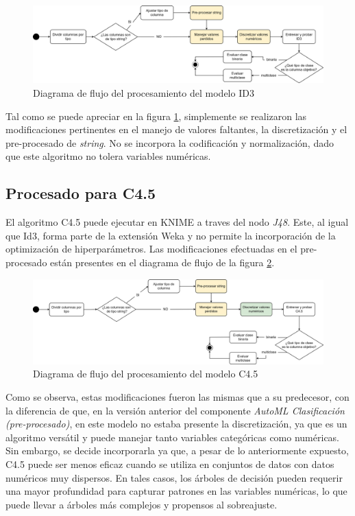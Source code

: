 \begin{figure}[H]
	\centering
	\includegraphics[width=1\linewidth]{"figuras/capi 2/modelos/procesado id3.drawio"}
	\caption{Diagrama de flujo del procesamiento del modelo ID3}
	\label{fig:procesado-id3}
\end{figure}

Tal como se puede apreciar en la figura \ref{fig:procesado-id3}, simplemente se realizaron las modificaciones pertinentes en el manejo de valores faltantes, la discretización y el pre-procesado de \textit{string}. No se incorpora la codificación y normalización, dado que este algoritmo no tolera variables numéricas.

\subsection{Procesado para C4.5}
El algoritmo C4.5 puede ejecutar en KNIME a traves del nodo \textit{J48}. Este, al igual que Id3, forma parte de la extensión Weka y no permite la incorporación de la optimización de hiperparámetros. Las modificaciones efectuadas en el pre-procesado están presentes en el diagrama de flujo de la figura \ref{fig:procesado-c4pt5}.

\begin{figure}[H]
	\centering
	\includegraphics[width=1\linewidth]{"figuras/capi 2/modelos/procesado c4pt5.drawio"}
	\caption{Diagrama de flujo del procesamiento del modelo C4.5}
	\label{fig:procesado-c4pt5}
\end{figure}

Como se observa, estas modificaciones fueron las mismas que a su predecesor, con la diferencia de que, en la versión anterior del componente \textit{AutoML Clasificación (pre-procesado)}, en este modelo no estaba presente la discretización, ya que es un algoritmo versátil y puede manejar tanto variables categóricas como numéricas. Sin embargo, se decide incorporarla ya que, a pesar de lo anteriormente expuesto, C4.5 puede ser menos eficaz cuando se utiliza en conjuntos de datos con datos numéricos muy dispersos. En tales casos, los árboles de decisión pueden requerir una mayor profundidad para capturar patrones en las variables numéricas, lo que puede llevar a árboles más complejos y propensos al sobreajuste. 

